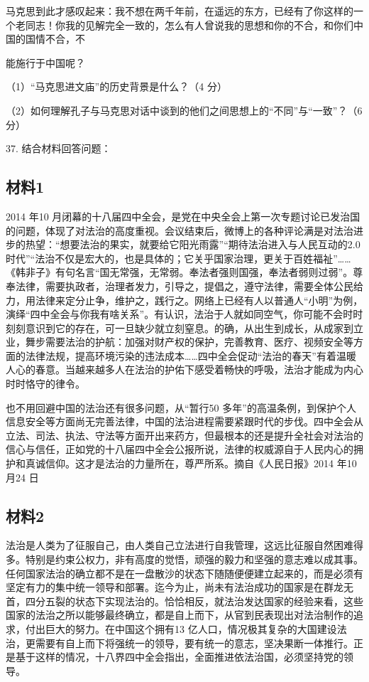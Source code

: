 \documentclass[UTF8,11pt]{ctexart}
\begin{document}
马克思到此才感叹起来：我不想在两千年前，在遥远的东方，已经有了你这样的一个老同志！你我的见解完全一致的，怎么有人曾说我的思想和你的不合，和你们中国的国情不合，不

能施行于中国呢？


（1）“马克思进文庙”的历史背景是什么？（4 分）


（2）如何理解孔子与马克思对话中谈到的他们之间思想上的“不同”与“一致”？（6 分）


37. 结合材料回答问题：


\subsection*{材料1}

2014 年10 月闭幕的十八届四中全会，是党在中央全会上第一次专题讨论已发治国的问题，体现了对法治的高度重视。会议结束后，微博上的各种评论满是对法治进步的热望：“想要法治的果实，就要给它阳光雨露”“期待法治进入与人民互动的2.0 时代”“法治不仅是宏大的，也是具体的；它关乎国家治理，更关于百姓福祉”……《韩非子》有句名言“国无常强，无常弱。奉法者强则国强，奉法者弱则过弱”。尊奉法律，需要执政者，治理者发力，引导之，提倡之，遵守法律，需要全体公民给力，用法律来定分止争，维护之，践行之。网络上已经有人以普通人“小明”为例，演绎“四中全会与你我有啥关系”。有认识，法治于人就如同空气，你可能不会时时刻刻意识到它的存在，可一旦缺少就立刻窒息。的确，从出生到成长，从成家到立业，舞步需要法治的护航：加强对财产权的保护，完善教育、医疗、视频安全等方面的法律法规，提高环境污染的违法成本……四中全会促动“法治的春天”有着温暖人心的春意。当越来越多人在法治的护佑下感受着畅快的呼吸，法治才能成为内心时时恪守的律令。

也不用回避中国的法治还有很多问题，从“暂行50 多年”的高温条例，到保护个人信息安全等方面尚无完善法律，中国的法治进程需要紧跟时代的步伐。四中全会从立法、司法、执法、守法等方面开出来药方，但最根本的还是提升全社会对法治的信心与信任，正如党的十八届四中全会公报所说，法律的权威源自于人民内心的拥护和真诚信仰。这才是法治的力量所在，尊严所系。摘自《人民日报》2014 年10 月24 日

\subsection*{材料2}

法治是人类为了征服自己，由人类自己立法进行自我管理，这远比征服自然困难得多。特别是约束公权力，非有高度的觉悟，顽强的毅力和坚强的意志难以成其事。任何国家法治的确立都不是在一盘散沙的状态下随随便便建立起来的，而是必须有坚定有力的集中统一领导和部署。迄今为止，尚未有法治成功的国家是在群龙无首，四分五裂的状态下实现法治的。恰恰相反，就法治发达国家的经验来看，这些国家的法治之所以能够最终确立，都是自上而下，从官到民表现出对法治制作的追求，付出巨大的努力。在中国这个拥有13 亿人口，情况极其复杂的大国建设法治，更需要有自上而下将强统一的领导，要有统一的意志，坚决果断一体推行。正是基于这样的情况，十八界四中全会指出，全面推进依法治国，必须坚持党的领导。
\end{document}
